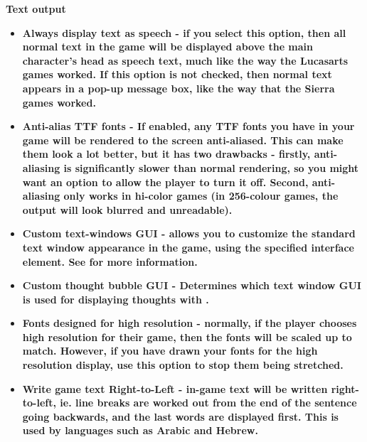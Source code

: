 \bf{Text output}
\begin{itemize}
\item \bf{Always display text as speech} - if you select this option, then all normal
text in the game will be displayed above the main character's head as speech
text, much like the way the Lucasarts games worked. If this option is not
checked, then normal text appears in a pop-up message box, like the way that
the Sierra games worked.
\item \bf{Anti-alias TTF fonts} - If enabled, any TTF fonts you have in your game will
be rendered to the screen anti-aliased. This can make them look a lot better, but it has
two drawbacks - firstly, anti-aliasing is significantly slower than normal rendering, so
you might want an option to allow the player to turn it off. Second, anti-aliasing only
works in hi-color games (in 256-colour games, the output will look blurred and unreadable).
\item \bf{Custom text-windows GUI} - allows you to customize the standard text window
appearance in the game, using the specified interface element. See 
for more information.
\item \bf{Custom thought bubble GUI} - Determines which text window GUI is used for displaying
thoughts with .
\item \bf{Fonts designed for high resolution} - normally, if the player chooses high resolution for their game, then
the fonts will be scaled up to match. However, if you have drawn your fonts
for the high resolution display, use this option to stop them being stretched.
\item \bf{Write game text Right-to-Left} - in-game text will be written right-to-left, ie. line
breaks are worked out from the end of the sentence going backwards, and the last words
are displayed first. This is used by languages such as Arabic and Hebrew.
\end{itemize}

